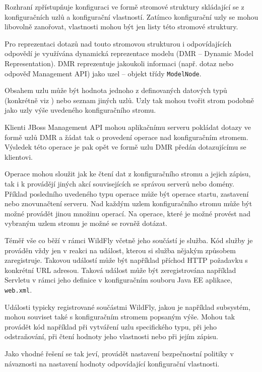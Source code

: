 Rozhraní zpřístupňuje konfiguraci ve formě stromové struktury skládající se z konfiguračních uzlů a konfigurační vlastností.
Zatímco konfigurační uzly se mohou libovolně zanořovat, vlastnosti mohou být jen listy této stromové struktury.
\cite{jbossDetypedManagement}

Pro reprezentaci dotazů nad touto stromovou strukturou i odpovídajících odpovědí je využívána dynamická reprezentace modelu (DMR -- Dynamic Model Representation).
DMR reprezentuje jakoukoli informaci (např. dotaz nebo odpověď Management API) jako uzel -- objekt třídy {\tt ModelNode}.
\cite{jbossDetypedManagement}

Obsahem uzlu může být hodnota jednoho z definovaných datových typů (konkrétně viz \cite{jboss7slideShare}) nebo seznam jiných uzlů.
Uzly tak mohou tvořit strom podobně jako uzly výše uvedeného konfiguračního stromu.
\cite{jboss7slideShare}

Klienti JBoss Management API mohou aplikačnímu serveru pokládat dotazy ve formě uzlů DMR a žádat tak o provedení operace nad konfiguračním stromem.
Výsledek této operace je pak opět ve formě uzlu DMR předán dotazujícímu se klientovi.
\cite{jbossDetypedManagement}

Operace mohou sloužit jak ke čtení dat z konfiguračního stromu a jejich zápisu, tak i k provádějí jiných akcí souvisejících se správou serverů nebo domény.
Příklad posledního uvedeného typu operace může být operace startu, zastavení nebo znovunačtení serveru.
Nad každým uzlem konfiguračního stromu může být možné provádět jinou množinu operací.
Na operace, které je možné provést nad vybraným uzlem stromu je možné se rovněž dotázat.
\cite{jbossDetypedManagement}

Téměř vše co běží v rámci WildFly včetně jeho součástí je služba. Kód služby je prováděn vždy jen v reakci na událost, kterou si služba nějakým způsobem zaregistruje.
Takovou událostí může být například příchod HTTP požadavku s konkrétní URL adresou.
Taková událost může být zeregistrována například Servletu v rámci jeho definice v konfiguračním souboru Java EE aplikace, {\tt web.xml}.
\cite{jboss7slideShare}

Události typicky registrované součástmi WildFly, jakou je například subsystém, mohou souviset také s konfiguračním stromem popsaným výše.
Mohou tak provádět kód například při vytváření uzlu specifického typu, při jeho odstraňování, při čtení hodnoty jeho vlastnosti nebo při jejím zápisu.
\cite{WildFlyExtending}

Jako vhodné řešení se tak jeví, provádět nastavení bezpečnostní politiky v návaznosti na nastavení hodnoty odpovídající konfigurační vlastnosti.

